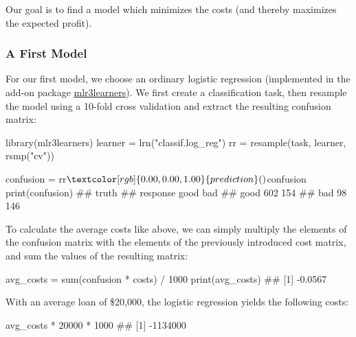 \documentclass[]{article}
\newenvironment{Shaded}{}{}
\newcommand{\DecValTok}[1]{#1}
\newcommand{\KeywordTok}[1]{\textcolor[rgb]{0.00,0.00,1.00}{#1}}
\newcommand{\NormalTok}[1]{#1}
\newcommand{\OperatorTok}[1]{#1}
\newcommand{\StringTok}[1]{\textcolor[rgb]{0.00,0.50,0.50}{#1}}
\renewenvironment{Shaded} {\begin{snugshade}\small} {\end{snugshade}}
\begin{document}
Our goal is to find a model which minimizes the costs (and thereby maximizes the expected profit).

\hypertarget{a-first-model}{%
\subsubsection{A First Model}\label{a-first-model}}

For our first model, we choose an ordinary logistic regression (implemented in the add-on package \href{https://mlr3learners.mlr-org.com}{mlr3learners}).
We first create a classification task, then resample the model using a 10-fold cross validation and extract the resulting confusion matrix:

\begin{Shaded}
\begin{Highlighting}[]
\KeywordTok{library}\NormalTok{(mlr3learners)}
\NormalTok{learner =}\StringTok{ }\KeywordTok{lrn}\NormalTok{(}\StringTok{"classif.log_reg"}\NormalTok{)}
\NormalTok{rr =}\StringTok{ }\KeywordTok{resample}\NormalTok{(task, learner, }\KeywordTok{rsmp}\NormalTok{(}\StringTok{"cv"}\NormalTok{))}

\NormalTok{confusion =}\StringTok{ }\NormalTok{rr}\OperatorTok{$}\KeywordTok{prediction}\NormalTok{()}\OperatorTok{$}\NormalTok{confusion}
\KeywordTok{print}\NormalTok{(confusion)}
\NormalTok{##         truth}
\NormalTok{## response good bad}
\NormalTok{##     good  602 154}
\NormalTok{##     bad    98 146}
\end{Highlighting}
\end{Shaded}

To calculate the average costs like above, we can simply multiply the elements of the confusion matrix with the elements of the previously introduced cost matrix, and sum the values of the resulting matrix:

\begin{Shaded}
\begin{Highlighting}[]
\NormalTok{avg_costs =}\StringTok{ }\KeywordTok{sum}\NormalTok{(confusion }\OperatorTok{*}\StringTok{ }\NormalTok{costs) }\OperatorTok{/}\StringTok{ }\DecValTok{1000}
\KeywordTok{print}\NormalTok{(avg_costs)}
\NormalTok{## [1] -0.0567}
\end{Highlighting}
\end{Shaded}

With an average loan of \$20,000, the logistic regression yields the following costs:

\begin{Shaded}
\begin{Highlighting}[]
\NormalTok{avg_costs }\OperatorTok{*}\StringTok{ }\DecValTok{20000} \OperatorTok{*}\StringTok{ }\DecValTok{1000}
\NormalTok{## [1] -1134000}
\end{Highlighting}
\end{Shaded}
\end{document}
